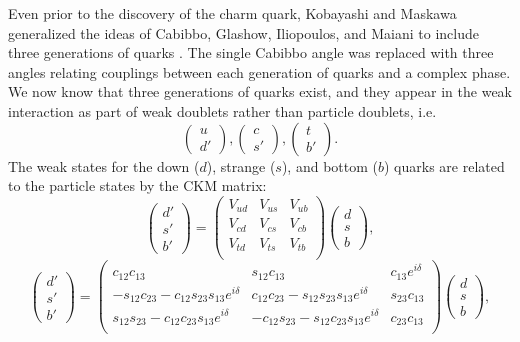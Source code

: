 Even prior to the discovery of the charm quark, Kobayashi and Maskawa generalized the ideas of
Cabibbo, Glashow, Iliopoulos, and Maiani to include three generations of quarks \cite{kobayashi1973}. The single
Cabibbo angle was replaced with three angles relating couplings between each generation of quarks and a complex
phase. We now know that three generations of quarks exist, and they appear in the weak interaction as part of weak
doublets rather than particle doublets, i.e.
%
\begin{equation}
  \begin{pmatrix} u \\ d' \end{pmatrix} ,
  \begin{pmatrix} c \\ s' \end{pmatrix} ,
  \begin{pmatrix} t \\ b' \end{pmatrix}.
\end{equation}
%
The weak states for the down ($d$), strange ($s$), and bottom ($b$) quarks are related to the particle states
by the CKM matrix: 
%
\begin{equation}
  \begin{pmatrix} d' \\s' \\ b' \end{pmatrix} =
  \begin{pmatrix} V_{ud} & V_{us} & V_{ub} \\
    V_{cd} & V_{cs} & V_{cb} \\
    V_{td} & V_{ts} & V_{tb} \\
  \end{pmatrix}
  \begin{pmatrix} d \\s \\ b \end{pmatrix} ,
\end{equation}
%
\begin{equation}
  \begin{pmatrix} d' \\s' \\ b' \end{pmatrix} =
  \begin{pmatrix} c_{12}c_{13} & s_{12}c_{13} & c_{13}e^{i\delta} \\
    -s_{12}c_{23}-c_{12}s_{23}s_{13}e^{i\delta} & c_{12}c_{23}-s_{12}s_{23}s_{13}e^{i\delta} & s_{23}c_{13} \\
    s_{12}s_{23}-c_{12}c_{23}s_{13}e^{i\delta} &  -c_{12}s_{23}-s_{12}c_{23}s_{13}e^{i\delta} & c_{23}c_{13} \\
  \end{pmatrix}
  \begin{pmatrix} d \\s \\ b \end{pmatrix},
\end{equation}


